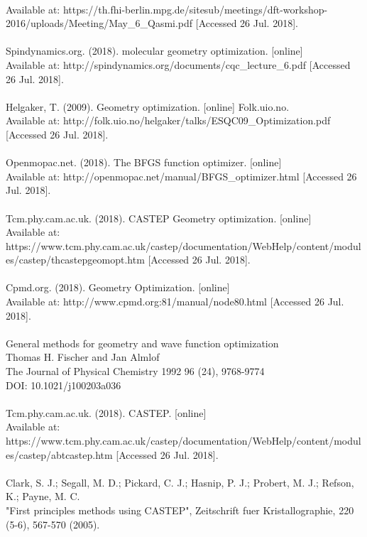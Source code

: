 \documentclass[9pt]{article}
\begin{document}
\\Available at: https://th.fhi-berlin.mpg.de/sitesub/meetings/dft-workshop-2016/uploads/Meeting/May\_6\_Qasmi.pdf [Accessed 26 Jul. 2018].
\\
\\
Spindynamics.org. (2018). molecular geometry optimization. [online]
\\Available at: http://spindynamics.org/documents/cqc\_lecture\_6.pdf [Accessed 26 Jul. 2018].
\\
\\
Helgaker, T. (2009). Geometry optimization. [online] Folk.uio.no. 
\\Available at: http://folk.uio.no/helgaker/talks/ESQC09\_Optimization.pdf [Accessed 26 Jul. 2018].
\\
\\
Openmopac.net. (2018). The BFGS function optimizer. [online] 
\\Available at: http://openmopac.net/manual/BFGS\_optimizer.html [Accessed 26 Jul. 2018].
\\
\\
Tcm.phy.cam.ac.uk. (2018). CASTEP Geometry optimization. [online] 
\\Available at: https://www.tcm.phy.cam.ac.uk/castep/documentation/WebHelp/content/modules/castep/thcastepgeomopt.htm [Accessed 26 Jul. 2018].
\\
\\
Cpmd.org. (2018). Geometry Optimization. [online] 
\\Available at: http://www.cpmd.org:81/manual/node80.html [Accessed 26 Jul. 2018].
\\
\\
General methods for geometry and wave function optimization
\\Thomas H. Fischer and Jan Almlof
\\The Journal of Physical Chemistry 1992 96 (24), 9768-9774
\\DOI: 10.1021/j100203a036
\\
\\
Tcm.phy.cam.ac.uk. (2018). CASTEP. [online] 
\\Available at: https://www.tcm.phy.cam.ac.uk/castep/documentation/WebHelp/content/modules/castep/abtcastep.htm [Accessed 26 Jul. 2018].
\\
\\
Clark, S. J.; Segall, M. D.; Pickard, C. J.; Hasnip, P. J.; Probert, M. J.; Refson, K.; Payne, M. C. 
\\"First principles methods using CASTEP", Zeitschrift fuer Kristallographie, 220 (5-6), 567-570 (2005).
\\
\\
\end{document}
